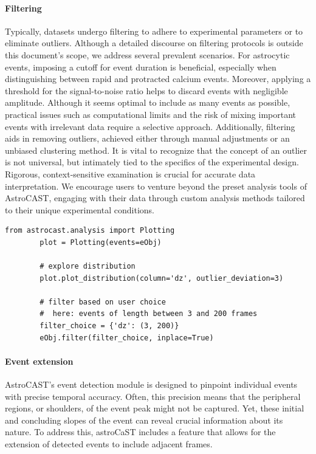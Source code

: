 \documentclass[utf8]{FrontiersinHarvard}
\begin{document}
    \paragraph{Filtering}
    Typically, datasets undergo filtering to adhere to experimental parameters or to eliminate outliers. Although a detailed discourse on filtering protocols is outside this document's scope, we address several prevalent scenarios. For astrocytic events, imposing a cutoff for event duration is beneficial, especially when distinguishing between rapid and protracted calcium events. Moreover, applying a threshold for the signal-to-noise ratio helps to discard events with negligible amplitude. Although it seems optimal to include as many events as possible, practical issues such as computational limits and the risk of mixing important events with irrelevant data require a selective approach. Additionally, filtering aids in removing outliers, achieved either through manual adjustments or an unbiased clustering method. It is vital to recognize that the concept of an outlier is not universal, but intimately tied to the specifics of the experimental design. Rigorous, context-sensitive examination is crucial for accurate data interpretation. We encourage users to venture beyond the preset analysis tools of AstroCAST, engaging with their data through custom analysis methods tailored to their unique experimental conditions.

    \begin{lstlisting}[style=pyStyle]
        from astrocast.analysis import Plotting
        plot = Plotting(events=eObj)

        # explore distribution
        plot.plot_distribution(column='dz', outlier_deviation=3)

        # filter based on user choice
        #  here: events of length between 3 and 200 frames
        filter_choice = {'dz': (3, 200)}
        eObj.filter(filter_choice, inplace=True)
    \end{lstlisting}

    \paragraph{Event extension}
    AstroCAST's event detection module is designed to pinpoint individual events with precise temporal accuracy. Often, this precision means that the peripheral regions, or shoulders, of the event peak might not be captured. Yet, these initial and concluding slopes of the event can reveal crucial information about its nature. To address this, astroCaST includes a feature that allows for the extension of detected events to include adjacent frames.
\end{document}
